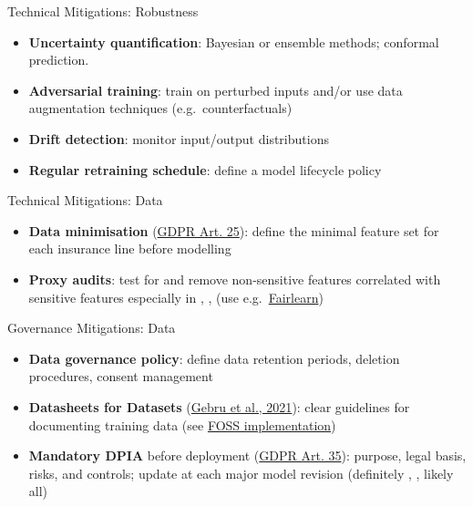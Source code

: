 \documentclass[
  ignorenonframetext,
]{beamer}
\providecommand{\tightlist}{%
  \setlength{\itemsep}{0pt}\setlength{\parskip}{0pt}}
\begin{document}
\begin{frame}{Technical Mitigations: Robustness}
\label{technical-mitigations-robustness}
\begin{itemize}
\tightlist
\item
  \textbf{Uncertainty quantification}: Bayesian or ensemble methods;
  conformal prediction.
\item
  \textbf{Adversarial training}: train on perturbed inputs and/or use
  data augmentation techniques (e.g.~counterfactuals)
\item
  \textbf{Drift detection}: monitor input/output distributions
\item
  \textbf{Regular retraining schedule}: define a model lifecycle policy
\end{itemize}
\end{frame}

\begin{frame}{Technical Mitigations: Data}
\label{technical-mitigations-data}
\begin{itemize}
\tightlist
\item
  \textbf{Data minimisation}
  (\href{https://gdpr-info.eu/art-25-gdpr/}{GDPR Art. 25}): define the
  minimal feature set for each insurance line before modelling
\item
  \textbf{Proxy audits}: test for and remove non-sensitive features
  correlated with sensitive features especially in
  , ,  (use
  e.g.~\href{https://fairlearn.org/v0.13/user_guide/mitigation/preprocessing.html}{Fairlearn})
\end{itemize}
\end{frame}

\begin{frame}{Governance Mitigations: Data}
\label{governance-mitigations-data}
\begin{itemize}
\tightlist
\item
  \textbf{Data governance policy}: define data retention periods,
  deletion procedures, consent management
\item
  \textbf{Datasheets for Datasets}
  (\href{https://dl.acm.org/doi/10.1145/3458723}{Gebru et al., 2021}):
  clear guidelines for documenting training data (see
  \href{https://github.com/bridge2ai/data-sheets-schema}{FOSS
  implementation})
\item
  \textbf{Mandatory DPIA} before deployment
  (\href{https://gdpr-info.eu/art-35-gdpr/}{GDPR Art. 35}): purpose,
  legal basis, risks, and controls; update at each major model revision
  (definitely , , likely all)
\end{itemize}
\end{frame}
\end{document}
